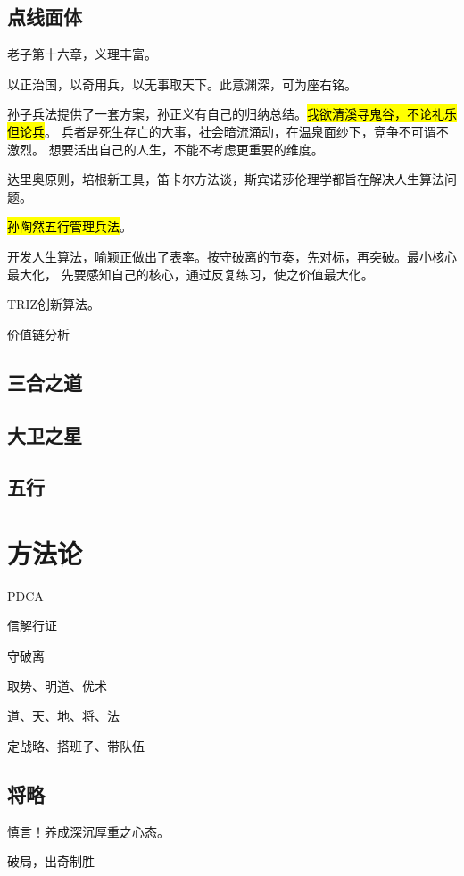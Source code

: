 \subsection{点线面体}

老子第十六章，义理丰富。

以正治国，以奇用兵，以无事取天下。此意渊深，可为座右铭。

孙子兵法提供了一套方案，孙正义有自己的归纳总结。\hl{我欲清溪寻鬼谷，不论礼乐但论兵}。
兵者是死生存亡的大事，社会暗流涌动，在温泉面纱下，竞争不可谓不激烈。
想要活出自己的人生，不能不考虑更重要的维度。

达里奥原则，培根新工具，笛卡尔方法谈，斯宾诺莎伦理学都旨在解决人生算法问题。

\hl{孙陶然五行管理兵法}。

开发人生算法，喻颖正做出了表率。按守破离的节奏，先对标，再突破。最小核心最大化，
先要感知自己的核心，通过反复练习，使之价值最大化。

TRIZ创新算法。

价值链分析

\subsection{三合之道}

\subsection{大卫之星}

\subsection{五行}

\section{方法论}

PDCA

信解行证

守破离

取势、明道、优术

道、天、地、将、法

定战略、搭班子、带队伍

\subsection{将略}

慎言！养成深沉厚重之心态。

破局，出奇制胜

